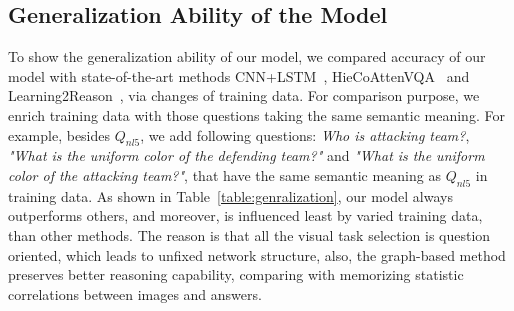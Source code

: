 

\subsection{Generalization Ability of the Model}

To show the generalization ability of our model, we compared accuracy of our model with state-of-the-art methods CNN+LSTM~\cite{VQA}, HieCoAttenVQA~\cite{Lu2016Hie} and Learning2Reason~\cite{hu2017learning}, via changes of training data. For comparison purpose, we enrich training data with those questions taking the same semantic meaning. For example, besides $Q_{nl5}$, we add following questions: \textit{Who is attacking team?}, \textit{"What is the uniform color of the defending team?"} and \textit{"What is the uniform color of the attacking team?"}, that have the same semantic meaning as $Q_{nl5}$ in training data. As shown in Table~\ref{table:genralization}, our model always outperforms others, and moreover, is influenced least by varied training data, than other methods. The reason is that all the visual task selection is question oriented, which leads to unfixed network structure, also, the graph-based method preserves better reasoning capability, comparing with memorizing statistic correlations between images and answers.




